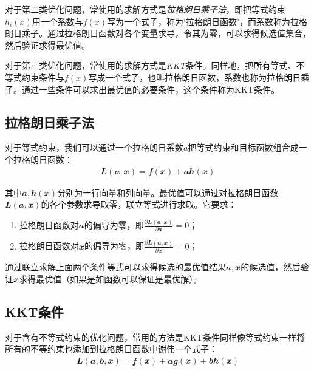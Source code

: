对于第二类优化问题，常使用的求解方式是\emph{拉格朗日乘子法}，即把等式约束$h_i(x)$用一个系数与$f(x)$写为一个式子，称为`拉格朗日函数'，而系数称为拉格朗日乘子。通过拉格朗日函数对各个变量求导，令其为零，可以求得候选值集合，然后验证求得最优值。

对于第三类优化问题，常使用的求解方式是\emph{KKT}条件。同样地，把所有等式、不等式约束条件与$f(x)$写成一个式子，也叫拉格朗日函数，系数也称为拉格朗日乘子。通过一些条件可以求出最优值的必要条件，这个条件称为KKT条件。




\subsection{拉格朗日乘子法}
对于等式约束，我们可以通过一个拉格朗日系数$a$把等式约束和目标函数组合成一个拉格朗日函数：
\begin{align}
  \mathbfit{L}(\mathbfit{a},\mathbfit{x})=\mathbfit{f}(\mathbfit{x})+\mathbfit{a}\mathbfit{h}(\mathbfit{x})
\end{align}

其中$\mathbfit{a},\mathbfit{h}(\mathbfit{x})$分别为一行向量和列向量。最优值可以通过对拉格朗日函数$\mathbfit{L}(\mathbfit{a},\mathbfit{x})$的各个参数求导取零，联立等式进行求取。它要求：
\begin{enumerate}
  \item 拉格朗日函数对$\mathbfit{a}$的偏导为零，即$\frac{\partial\mathbfit{L}(\mathbfit{a},\mathbfit{x})}{\partial \mathbfit{a}}=0$；
  \item 拉格朗日函数对$\mathbfit{x}$的偏导为零，即$\frac{\partial\mathbfit{L}(\mathbfit{a},\mathbfit{x})}{\partial \mathbfit{x}}=0$；
\end{enumerate}

通过联立求解上面两个条件等式可以求得候选的最优值结果$\mathbfit{a},\mathbfit{x}$的候选值，然后验证$\mathbfit{x}$求得最优值（如果是如函数可以保证是最优解）。




\subsection{KKT条件}
对于含有不等式约束的优化问题，常用的方法是KKT条件同样像等式约束一样将所有的不等约束也添加到拉格朗日函数中谢伟一个式子：
\begin{align}
  \mathbfit{L}(\mathbfit{a},\mathbfit{b},\mathbfit{x})=\mathbfit{f}(\mathbfit{x})+\mathbfit{a}\mathbfit{g}(\mathbfit{x})+\mathbfit{b}\mathbfit{h}(\mathbfit{x})
\end{align}

